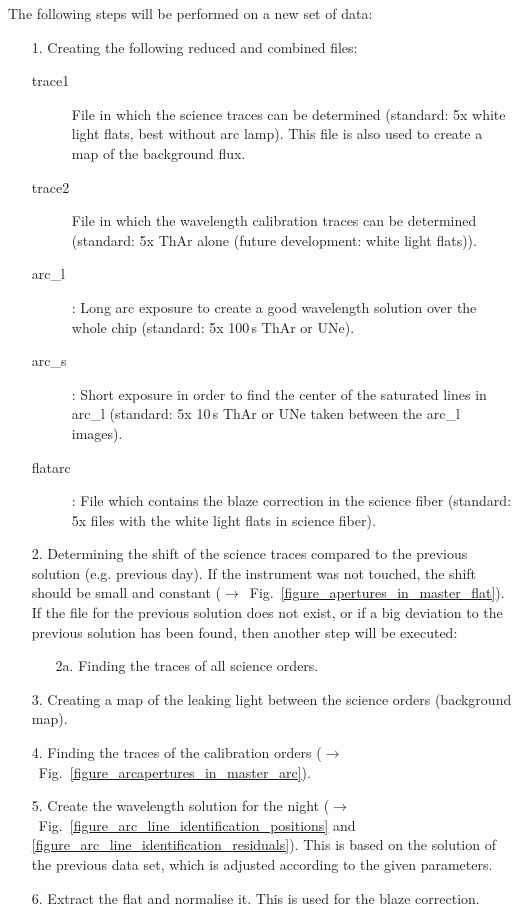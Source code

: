 \documentclass[10pt,a4paper]{article}
\begin{document}
\noindent The following steps will be performed on a new set of data:
\begin{itemize}
  \item[1.] Creating the following reduced and combined files:
  \begin{description}
    \item[trace1] File in which the science traces can be determined (standard: 5x white light flats, best without arc lamp). This file is also used to create a map of the background flux.
    \item[trace2] File in which the wavelength calibration traces can be determined (standard: 5x ThAr alone (future development: white light flats)).
    \item[arc\_l]: Long arc exposure to create a good wavelength solution over the whole chip (standard: 5x 100\,s ThAr or UNe).
    \item[arc\_s]: Short exposure in order to find the center of the saturated lines in arc\_l (standard: 5x 10\,s ThAr or UNe taken between the arc\_l images).
    \item[flatarc]: File which contains the blaze correction in the science fiber (standard: 5x files with the white light flats in science fiber).
  \end{description}
  \item[2.] Determining the shift of the science traces compared to the previous solution (e.g. previous day). If the instrument was not touched, the shift should be small and constant ($\rightarrow$~Fig.~\ref{figure_apertures_in_master_flat}). If the file for the previous solution does not exist, or if a big deviation to the previous solution has been found, then another step will be executed:
  \begin{itemize}
    \item[2a.] Finding the traces of all science orders.
  \end{itemize}
  \item[3.] Creating a map of the leaking light between the science orders (background map).
  \item[4.] Finding the traces of the calibration orders ($\rightarrow$~Fig.~\ref{figure_arcapertures_in_master_arc}).
  \item[5.] Create the wavelength solution for the night ($\rightarrow$~Fig.~\ref{figure_arc_line_identification_positions} and \ref{figure_arc_line_identification_residuals}). This is based on the solution of the previous data set, which is adjusted according to the given parameters.
  \item[6.] Extract the flat and normalise it. This is used for the blaze correction.

\end{itemize}
\end{document}
